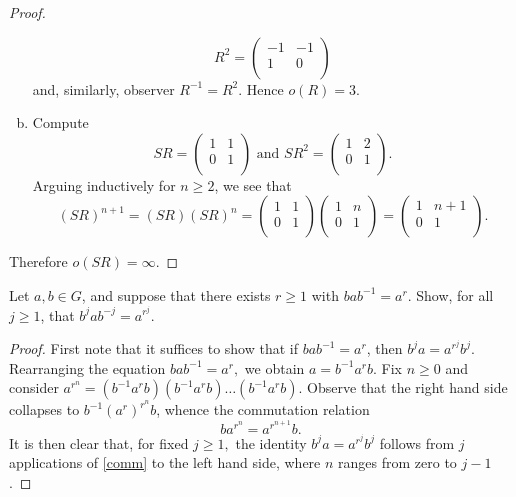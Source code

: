 \documentclass[10pt]{amsart}
\begin{document}
\begin{thm}
\begin{proof}
\begin{enumerate}[(a)]
      $$R^2 = \left(\begin{array}{cc}
        -1 & -1\\
        1 & 0 \\
        \end{array}\right)$$
      and, similarly, observer $R^{-1} = R^2.$  Hence $o(R) = 3$.
    \item
      Compute 
      $$SR = \left(\begin{array}{cc}
        1 & 1\\
        0 & 1 \\
        \end{array}\right)
      \text{ and }
      SR^2 = \left(\begin{array}{cc}
        1 & 2\\
        0 & 1 \\
        \end{array}\right).$$
      Arguing inductively for $n \geq 2$, we see that $$(SR)^{n+1} = (SR)(SR)^{n} = \left(\begin{array}{cc}
        1 & 1\\
        0 & 1 \\
        \end{array}\right)
      \left(\begin{array}{cc}
        1 & n\\
        0 & 1 \\
        \end{array}\right) = 
      \left(\begin{array}{cc}
        1 & n+1\\
        0 & 1 \\
        \end{array}\right).$$
    \end{enumerate}
    Therefore $o(SR) = \infty.$
  \end{proof}
\end{thm}

\begin{thm}
	Let $a,b \in G$, and suppose that there exists $r \geq 1$ with $bab^{-1} = a^r.$
	Show, for all $j \geq 1$, that $b^jab^{-j} = a^{r^j}$.
	\begin{proof}
          First note that it suffices to show that if $bab^{-1} = a^r$, then $b^j a = a^{r^j} b^j$.
          Rearranging the equation $bab^{-1} = a^r,$ we obtain $a = b^{-1}a^rb$. 
          Fix $n \geq 0$ and consider $a^{r^n} = (b^{-1}a^rb)(b^{-1}a^rb)\ldots(b^{-1}a^rb)$.
          Observe that the right hand side collapses to $b^{-1}(a^r)^{r^n}b$, whence the commutation relation 
          \begin{equation}\label{comm}
            ba^{r^n} = a^{r^{n+1}}b.
          \end{equation}
          It is then clear that, for fixed $j \geq 1,$ the identity $b^ja = a^{r^j}b^j$ follows from $j$ applications of \eqref{comm} to the left hand side, where $n$ ranges from zero to $j - 1$.
	\end{proof}
\end{thm}
\end{document}
